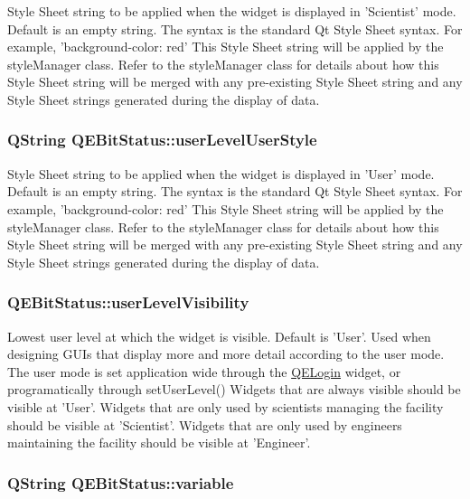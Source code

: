 Style Sheet string to be applied when the widget is displayed in 'Scientist' mode. Default is an empty string. The syntax is the standard Qt Style Sheet syntax. For example, 'background-\/color: red' This Style Sheet string will be applied by the styleManager class. Refer to the styleManager class for details about how this Style Sheet string will be merged with any pre-\/existing Style Sheet string and any Style Sheet strings generated during the display of data. \hypertarget{classQEBitStatus_ab79cc284ddbcd52a98e74cab7b590739}{
\subsubsection[{userLevelUserStyle}]{\setlength{\rightskip}{0pt plus 5cm}QString QEBitStatus::userLevelUserStyle}}
\label{classQEBitStatus_ab79cc284ddbcd52a98e74cab7b590739}
Style Sheet string to be applied when the widget is displayed in 'User' mode. Default is an empty string. The syntax is the standard Qt Style Sheet syntax. For example, 'background-\/color: red' This Style Sheet string will be applied by the styleManager class. Refer to the styleManager class for details about how this Style Sheet string will be merged with any pre-\/existing Style Sheet string and any Style Sheet strings generated during the display of data. \hypertarget{classQEBitStatus_af9179749c38691f33cdcf1f8de7d3e3d}{
\subsubsection[{userLevelVisibility}]{ QEBitStatus::userLevelVisibility}}
\label{classQEBitStatus_af9179749c38691f33cdcf1f8de7d3e3d}
Lowest user level at which the widget is visible. Default is 'User'. Used when designing GUIs that display more and more detail according to the user mode. The user mode is set application wide through the \hyperlink{classQELogin}{QELogin} widget, or programatically through setUserLevel() Widgets that are always visible should be visible at 'User'. Widgets that are only used by scientists managing the facility should be visible at 'Scientist'. Widgets that are only used by engineers maintaining the facility should be visible at 'Engineer'. \hypertarget{classQEBitStatus_a1025f61dcda8397905e8d46b7efdb577}{
\subsubsection[{variable}]{\setlength{\rightskip}{0pt plus 5cm}QString QEBitStatus::variable}}
